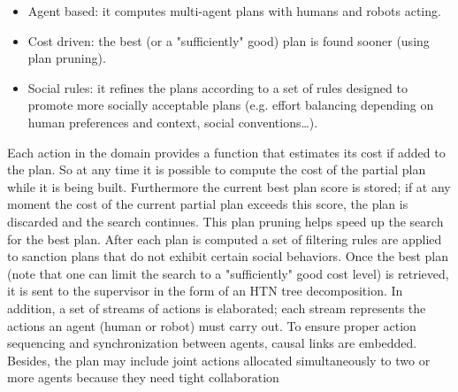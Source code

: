 \begin{itemize}
\item Agent based: it computes multi-agent plans with humans and robots acting.
\item Cost driven: the best (or a "sufficiently" good) plan is found sooner (using plan pruning).
\item Social rules: it refines the plans according to a set of rules designed to promote more socially acceptable plans  (e.g. effort balancing depending on human preferences and context, social conventions\ldots).
\end{itemize}



Each action in the domain provides a function that estimates its cost if added to the plan. So at any time it is possible to compute the cost of the partial plan while it is being built. Furthermore the current best plan score is stored;  if at any moment the cost of the current partial plan exceeds this score, the plan is discarded and the search continues. This plan pruning helps speed up the search for the best plan. After each plan is computed a set of filtering rules are applied to sanction plans that do not exhibit certain social behaviors. Once the best plan (note that one can limit the search to a "sufficiently" good  cost level)   is retrieved, it is sent to the supervisor in the form of an HTN tree decomposition. In addition, a set of streams of actions is elaborated; each stream represents the actions an agent (human or robot) must carry out. To ensure proper action sequencing and synchronization between agents, causal links are embedded. Besides, the plan may include joint actions allocated simultaneously to two or more agents because they need tight collaboration


